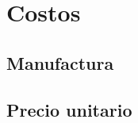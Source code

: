 
\pagestyle{myportland}
\doublespacing
\chapter[----- Costos]{Costos}
\thispagestyle{myportland}

\section{Manufactura}

\section{Precio unitario}

